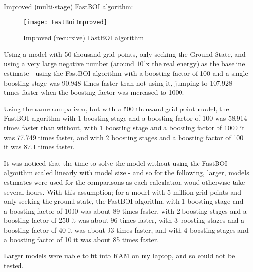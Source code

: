 Improved (multi-stage) FastBOI algorithm:
\begin{figure}[!htb]
	\texttt{[image: FastBoiImproved]}
	\centering
	\caption{Improved (recursive) FastBOI algorithm}
\end{figure}

Using a model with 50 thousand grid points, only seeking the Ground State, and using a very large negative number (around $10^{3}$x the real energy) as the baseline estimate - using the FastBOI algorithm with a boosting factor of 100 and a single boosting stage was 90.948 times faster than not using it, jumping to 107.928 times faster when the boosting factor was increased to 1000. 

Using the same comparison, but with a 500 thousand grid point model, the FastBOI algorithm with 1 boosting stage and a boosting factor of 100 was 58.914 times faster than without, with 1 boosting stage and a boosting factor of 1000 it was 77.749 times faster, and with 2 boosting stages and a boosting factor of 100 it was 87.1 times faster. 

It was noticed that the time to solve the model without using the FastBOI algorithm scaled linearly with model size - and so for the following, larger, models estimates were used for the comparisons as each calculation woud otherwise take several hours. With this assumption; for a model with 5 million grid points and only seeking the ground state, the FastBOI algorithm with 1 boosting stage and a boosting factor of 1000 was about 89 times faster, with 2 boosting stages and a boosting factor of 250 it was about 96 times faster, with 3 boosting stages and a boosting factor of 40 it was about 93 times faster, and with 4 boosting stages and a boosting factor of 10 it was about 85 times faster.

Larger models were uable to fit into RAM on my laptop, and so could not be tested.


%
%

